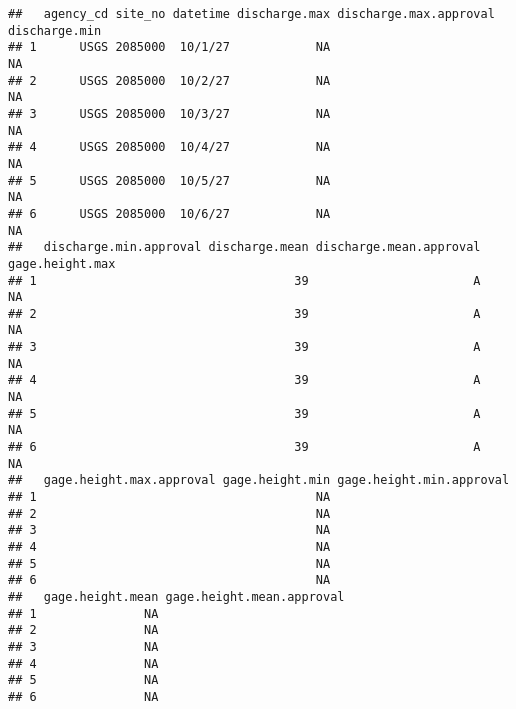 \documentclass[]{article}
\newenvironment{Shaded}{\begin{snugshade}}{\end{snugshade}}
\newcommand{\CommentTok}[1]{\textcolor[rgb]{0.56,0.35,0.01}{\textit{#1}}}
\newcommand{\DecValTok}[1]{\textcolor[rgb]{0.00,0.00,0.81}{#1}}
\newcommand{\KeywordTok}[1]{\textcolor[rgb]{0.13,0.29,0.53}{\textbf{#1}}}
\newcommand{\NormalTok}[1]{#1}
\begin{document}
\begin{verbatim}
##   agency_cd site_no datetime discharge.max discharge.max.approval discharge.min
## 1      USGS 2085000  10/1/27            NA                                   NA
## 2      USGS 2085000  10/2/27            NA                                   NA
## 3      USGS 2085000  10/3/27            NA                                   NA
## 4      USGS 2085000  10/4/27            NA                                   NA
## 5      USGS 2085000  10/5/27            NA                                   NA
## 6      USGS 2085000  10/6/27            NA                                   NA
##   discharge.min.approval discharge.mean discharge.mean.approval gage.height.max
## 1                                    39                       A              NA
## 2                                    39                       A              NA
## 3                                    39                       A              NA
## 4                                    39                       A              NA
## 5                                    39                       A              NA
## 6                                    39                       A              NA
##   gage.height.max.approval gage.height.min gage.height.min.approval
## 1                                       NA                         
## 2                                       NA                         
## 3                                       NA                         
## 4                                       NA                         
## 5                                       NA                         
## 6                                       NA                         
##   gage.height.mean gage.height.mean.approval
## 1               NA                          
## 2               NA                          
## 3               NA                          
## 4               NA                          
## 5               NA                          
## 6               NA
\end{verbatim}

\begin{Shaded}
\end{Shaded}
\end{document}
